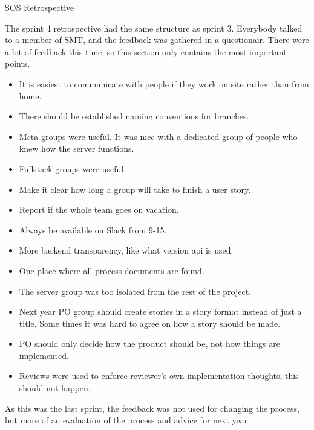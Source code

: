 \gls{SOS Retrospective}

The sprint 4 retrospective had the same structure as sprint 3. Everybody talked to a member of \gls{SMT}, and the feedback was gathered in a questionair. There were a lot of feedback this time, so this section only contains the most important points. 

\begin{itemize}
    \item It is easiest to communicate with people if they work on site rather than from home.
    \item There should be established naming conventions for branches.
    \item Meta groups were useful. It was nice with a dedicated group of people who knew how the server functions.
    \item Fullstack groups were useful.
    \item Make it clear how long a group will take to finish a user story.
    \item Report if the whole team goes on vacation.
    \item Always be available on Slack from 9-15.
    \item More backend transparency, like what version api is used.
    \item One place where all process documents are found.
    \item The server group was too isolated from the rest of the project. 
    \item Next year PO group should create stories in a story format instead of just a title. Some times it was hard to agree on how a story should be made. 
    \item PO should only decide how the product should be, not how things are implemented.
    \item Reviews were used to enforce reviewer's own implementation thoughts, this should not happen. 
\end{itemize}

As this was the last sprint, the feedback was not used for changing the process, but more of an evaluation of the process and advice for next year.